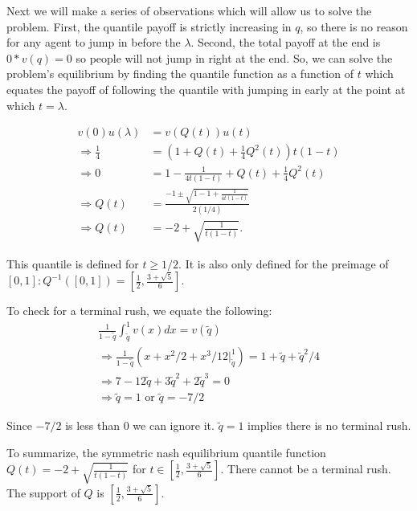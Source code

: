 \documentclass[11pt]{article} %
\begin{document}
Next we will make a series of observations which will allow us to solve the problem. First, the quantile payoff is strictly increasing in $q$, so there is no reason for any agent to jump in before the $\lambda$. Second, the total payoff at the end is $0*v(q) = 0$ so people will not jump in right at the end. So, we can solve the problem's equilibrium by finding the quantile function as a function of $t$ which equates the payoff of following the quantile with jumping in early at the point at which $t=\lambda.$

\begin{align*}
v(0)u(\lambda) &= v(Q(t))u(t) \\
\Rightarrow \frac{1}{4} &= \left(1+Q(t) + \frac{1}{4}Q^2(t)\right)t(1-t) \\
\Rightarrow 0 &= 1-\frac{1}{4t(1-t)} + Q(t) + \frac{1}{4}Q^2(t)\\
\Rightarrow Q(t) &= \frac{-1\pm \sqrt{1 - 1 + \frac{1}{4t(1-t)}}}{2(1/4)}\\
\Rightarrow Q(t) &= -2 + \sqrt{\frac{1}{t(1-t)}}.
\end{align*}

This quantile is defined for $t\geq1/2$. It is also only defined for the preimage of $[0,1]: Q^{-1}([0,1]) =  [\frac{1}{2},\frac{3+\sqrt{5}}{6}]$.

To check for a terminal rush, we equate the following:
\begin{align*}
\frac{1}{1-\tilde{q}}\int_{\tilde{q}}^1v(x)dx = v(\tilde{q})\\
\Rightarrow \frac{1}{1-\tilde{q}}\left( x+x^2/2 + x^3/12 |_{\tilde{q}}^1\right) = 1+\tilde{q} + \tilde{q}^2/4\\
\Rightarrow 7 - 12\tilde{q} + 3\tilde{q}^2 + 2\tilde{q}^3 = 0\\
\Rightarrow \tilde{q} = 1 \text{ or } \tilde{q} = -7/2
\end{align*}

Since $-7/2$ is less than $0$ we can ignore it. $\tilde{q} = 1$ implies there is no terminal rush.

To summarize, the symmetric nash equilibrium quantile function $Q(t) =  -2 + \sqrt{\frac{1}{t(1-t)}}$ for $t\in [\frac{1}{2},\frac{3+\sqrt{5}}{6}]$. There cannot be a terminal rush. The support of $Q$ is $[\frac{1}{2},\frac{3+\sqrt{5}}{6}].$
\end{document}
